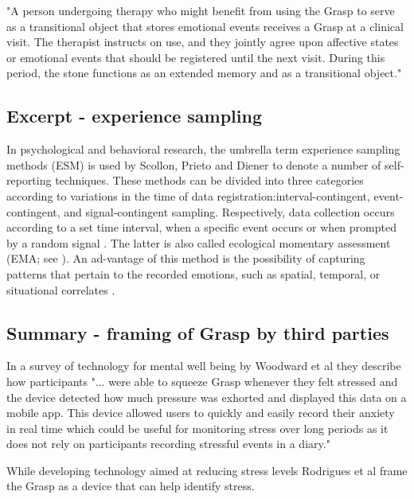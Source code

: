 "A person undergoing therapy who might benefit from using the Grasp to serve as a transitional object \cite{Arthern} that stores emotional events receives a Grasp at a clinical visit. The therapist instructs on use, and they jointly agree upon affective states or emotional events that should be registered until the next visit. During this period, the stone functions as an extended memory and as a transitional object." \cite[p.~7]{guribye2016}

\subsection{Excerpt - experience sampling }
In psychological and behavioral research, the umbrella term experience sampling methods (ESM) is used by Scollon, Prieto  and  Diener  \cite{scollon2003}  to  denote  a  number  of  self-reporting techniques.   These methods can be divided into three categories according to variations in the time of data registration:interval-contingent,  event-contingent,  and  signal-contingent sampling.  Respectively, data collection occurs according to a  set  time  interval,  when  a  specific  event  occurs  or  when prompted by a random signal \cite{scollon2003}.  The latter is also called ecological momentary assessment (EMA; see \cite{shiffman2008}).  An ad-vantage of this method is the possibility of capturing patterns that pertain to the recorded emotions, such as spatial, temporal, or situational correlates \cite{scollon2003}. \cite[p.~2]{guribye2016}

\subsection{Summary - framing of Grasp by third parties}
In a survey of technology for mental well being by Woodward et al \cite[p.~6]{DBLP:journals/corr/abs-1905-00288} they describe how participants "... were able to squeeze Grasp whenever they felt stressed and the device detected how much pressure was exhorted and displayed this data on a mobile app. This device allowed users to quickly and easily record their anxiety in real time which could be useful for monitoring stress over long periods as it does not rely on participants recording stressful events in a diary."

While developing technology aimed at reducing stress levels Rodrigues et al \cite[p.~1]{Rodrigues:2019:LTS:3341162.3343773} frame the Grasp as a device that can help identify stress.


